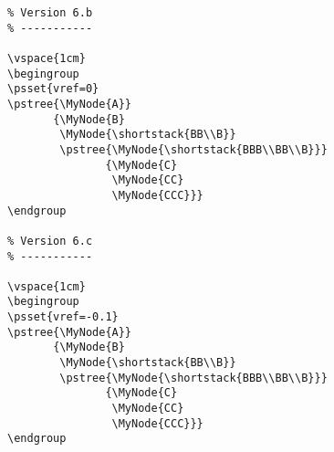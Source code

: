 \documentclass{article}
\begin{document}
\begin{verbatim}
% Version 6.b
% -----------

\vspace{1cm}
\begingroup
\psset{vref=0}
\pstree{\MyNode{A}}
       {\MyNode{B}
        \MyNode{\shortstack{BB\\B}}
        \pstree{\MyNode{\shortstack{BBB\\BB\\B}}}
               {\MyNode{C}
                \MyNode{CC}
                \MyNode{CCC}}}
\endgroup

% Version 6.c
% -----------

\vspace{1cm}
\begingroup
\psset{vref=-0.1}
\pstree{\MyNode{A}}
       {\MyNode{B}
        \MyNode{\shortstack{BB\\B}}
        \pstree{\MyNode{\shortstack{BBB\\BB\\B}}}
               {\MyNode{C}
                \MyNode{CC}
                \MyNode{CCC}}}
\endgroup
\end{verbatim}
\end{document}
